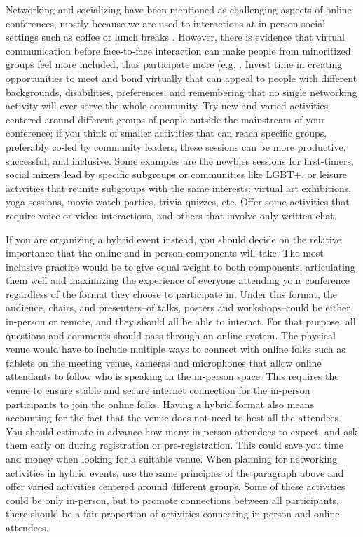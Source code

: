 \documentclass[10pt,letterpaper]{article}
\begin{document}
Networking and socializing have been mentioned as challenging aspects of online conferences, mostly because we are used to interactions at in-person social settings such as coffee or lunch breaks \cite{salibaGettingGripsOnline2020, roosOnlineConferencesNew2020}. 
However, there is evidence that virtual communication before face-to-face interaction can make people from minoritized groups feel more included, thus participate more (e.g. \cite{trianaDoesOrderFacetoFace2012,blackEngenderingBelongingThoughtful2020}.
Invest time in creating opportunities to meet and bond virtually that can appeal to people with different backgrounds, disabilities, preferences, and remembering that no single networking activity will ever serve the whole community. 
Try new and varied activities centered around different groups of people outside the mainstream of your conference; if you think of smaller activities that can reach specific groups, preferably co-led by community leaders, these sessions can be more productive, successful, and inclusive.
Some examples are the newbies sessions for first-timers, social mixers lead by specific subgroups or communities like LGBT+, or leisure activities that reunite subgroups with the same interests: virtual art exhibitions, yoga sessions, movie watch parties, trivia quizzes, etc. 
Offer some activities that require voice or video interactions, and others that involve only written chat.

If you are organizing a hybrid event instead, you should decide on the relative importance that the online and in-person components will take. The most inclusive practice would be to give equal weight to both components, articulating them well and maximizing the experience of everyone attending your conference regardless of the format they choose to participate in. 
Under this format, the audience, chairs, and presenters--of talks, posters and workshops--could be either in-person or remote, and they should all be able to interact. 
For that purpose, all questions and comments should pass through an online system. 
The physical venue would have to include multiple ways to connect with online folks such as tablets on the meeting venue, cameras and microphones that allow online attendants to follow who is speaking in the in-person space.
This requires the venue to ensure stable and secure internet connection for the in-person participants to join the online folks. 
Having a hybrid format also means accounting for the fact that the venue does not need to host all the attendees. You should estimate in advance how many in-person attendees to expect, and ask them early on during registration or pre-registration. This could save you time and money when looking for a suitable venue.
When planning for networking activities in hybrid events, use the same principles of the paragraph above and offer varied activities centered around different groups. Some of these activities could be only in-person, but to promote connections between all participants, there should be a fair proportion of activities connecting in-person and online attendees. 
\end{document}
